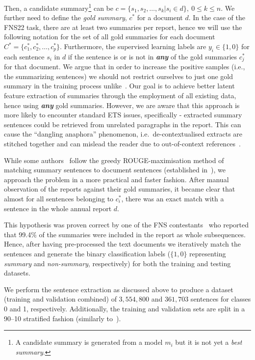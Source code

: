 Then, a candidate summary\footnote{
    A candidate summary is generated from a model $m_{i}$ but it is not yet a \emph{best summary}.
} can be $c=\{s_{1}, s_{2}, \dots, s_{k} | s_{i} \in d \}, \ 0 \leq k \leq n$.
We further need to define the \emph{gold summary}, $c^{*}$ for a document $d$.
In the case of the FNS22 task, there are at least two summaries per report, hence we will use the following notation for the set of all gold summaries for each document $C^{*} = \{c^{*}_{1}, c^{*}_{2}, \dots, c^{*}_{p}\}$.
Furthermore, the supervised learning labels are $y_{i} \in \{1,0\}$ for each sentence $s_{i}$ in $d$ if the sentence is or is not in \textbf{\emph{any}} of the gold summaries $c^{*}_{j}$ for that document.
We argue that in order to increase the positive samples (i.e., the summarizing sentences) we should not restrict
ourselves to just one gold summary in the training process unlike~\cite{orzhenovskii-2021-t5}.
Our goal is to achieve better latent feature extraction of summaries through the employment of all existing data, hence using \textbf{\emph{any}} gold summaries.
However, we are aware that this approach is more likely to encounter standard ETS issues, specifically - extracted summary sentences could be retrieved from unrelated paragraphs in the report.
This can cause the \enquote{dangling anaphora} phenomenon, i.e.\ de-contextualised extracts are stitched together and can mislead the reader due to out-of-context references~\cite{lin2009summarization}.

While some authors~\cite{zmandar-etal-2021-joint} follow the greedy ROUGE-maximisation method of matching summary
sentences to document sentences (established in~\cite{nallapati2017summarunner}), we approach the problem in a
more practical and faster fashion.
After manual observation of the reports against their gold summaries, it became clear that almost for all sentences
belonging to $c^{*}_{i}$, there was an exact match with a sentence in the whole annual report $d$.

This hypothesis was proven correct by one of the FNS contestants~\cite{orzhenovskii-2021-t5} who reported that
99.4\% of the summaries were included in the report as whole subsequences.
Hence, after having pre-processed the text documents we iteratively match the sentences and generate the binary
classification labels ($\{1,0\}$ representing \emph{summary} and \emph{non-summary}, respectively) for both
the training and testing datasets.

We perform the sentence extraction as discussed above to produce a dataset (training and validation combined) of $3,554,800$ and $361,703$ sentences for classes 0 and 1, respectively.
Additionally, the training and validation sets are split in a 90--10 stratified fashion (similarly to~\cite{stepisnik-perdih-etal-2022-sentiment}).

